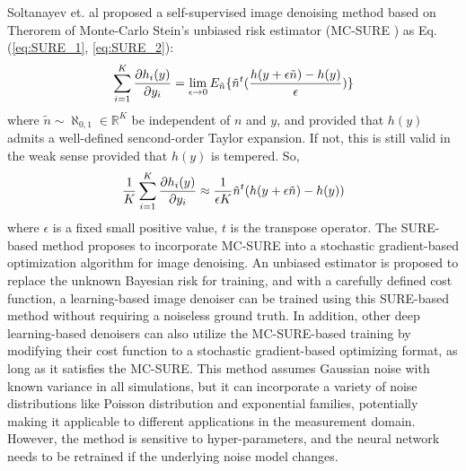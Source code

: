 \documentclass[conference]{IEEEtran}
\begin{document}
Soltanayev et. al \cite{soltanayev2018training} proposed a self-supervised image denoising method based on Therorem of Monte-Carlo Stein’s unbiased risk estimator (MC-SURE \cite{ramani2008monte}) as Eq. (\ref{eq:SURE_1}, \ref{eq:SURE_2}):
\begin{equation}
	\setlength{\abovedisplayskip}{0pt}
	\setlength{\belowdisplayskip}{0pt}
	\sum\limits_{i=1}^K\frac{\partial h_i(y)}{\partial y_i}= \lim \limits_{\epsilon \rightarrow 0}{E_{\tilde{n}}\{\tilde{n}^t(\frac{h(y+\epsilon \tilde{n})-h(y)}{\epsilon})\}}
	\label{eq:SURE_1}
\end{equation}
where $\tilde{n} \sim \aleph_{0,1} \in \mathbb{R}^K$ be independent of $n$ and $y$, and provided that $h(y)$ admits a well-defined sencond-order Taylor expansion. If not, this is still valid in the weak sense provided that $h(y)$ is tempered.
So,
\begin{equation}
	\setlength{\abovedisplayskip}{0pt}
	\setlength{\belowdisplayskip}{0pt}
	\frac{1}{K}\sum\limits_{i=1}^K\frac{\partial h_i(y)}{\partial y_i} \approx \frac{1}{\epsilon K}\tilde{n}^t(h(y+\epsilon \tilde{n})-h(y))
	\label{eq:SURE_2}
\end{equation}
where $\epsilon$ is a fixed small positive value, $t$ is the transpose operator.
The SURE-based method proposes to incorporate MC-SURE \cite{ramani2008monte} into a stochastic gradient-based optimization algorithm for image denoising. An unbiased estimator is proposed to replace the unknown Bayesian risk for training, and with a carefully defined cost function, a learning-based image denoiser can be trained using this SURE-based method without requiring a noiseless ground truth. In addition, other deep learning-based denoisers can also utilize the MC-SURE-based training by modifying their cost function to a stochastic gradient-based optimizing format, as long as it satisfies the MC-SURE.
This method assumes Gaussian noise with known variance in all simulations, but it can incorporate a variety of noise distributions like Poisson distribution and exponential families, potentially making it applicable to different applications in the measurement domain. However, the method is sensitive to hyper-parameters, and the neural network needs to be retrained if the underlying noise model changes.
\end{document}
